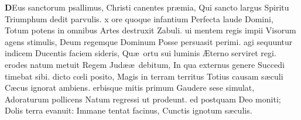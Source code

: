 \documentclass[letter,11pt]{book}
\begin{document}
\begin{multicols*}{2}
\lettrine[lines=2]{\bfseries \color{Red} D}{}Eus sanctorum psallimus,
\newline Christi canentes pr\ae mia,
\newline \indent Qui sancto largus Spiritu
\newline \indent Triumphum dedit parvulis.
x ore quoque infantium
\newline \indent Perfecta laude Domini,
\newline \indent Totum potens in omnibus
\newline \indent Artes destruxit Zabuli.
ui mentem regis impii
\newline \indent Visorum agens stimulis,
\newline \indent Deum regemque Dominum
\newline \indent Posse persuasit perimi.
agi sequuntur indicem
\newline \indent Ducentis faciem sideris,
\newline \indent Qu\ae \ ortu sui luminis
\newline \indent \AE terno serviret regi.
erodes natum metuit
\newline \indent Regem Jud\ae \ae \ debitum,
\newline \indent In qua externus genere
\newline \indent Succedi timebat sibi.
 dicto c\oe li posito,
\newline \indent Magis in terram territus
\newline \indent Totius causam s\ae culi
\newline \indent C\ae cus ignorat ambiens.
erbisque mitis primum
\newline \indent Gaudere sese simulat,
\newline \indent Adoraturum pollicens
\newline \indent Natum regressi ut prodeunt.
ed postquam Deo moniti;
\newline \indent Dolis terra evanuit:
\newline \indent Immane tentat facinus,
\newline \indent Cunctis ignotum s\ae culis.

\end{multicols*}
\end{document}
